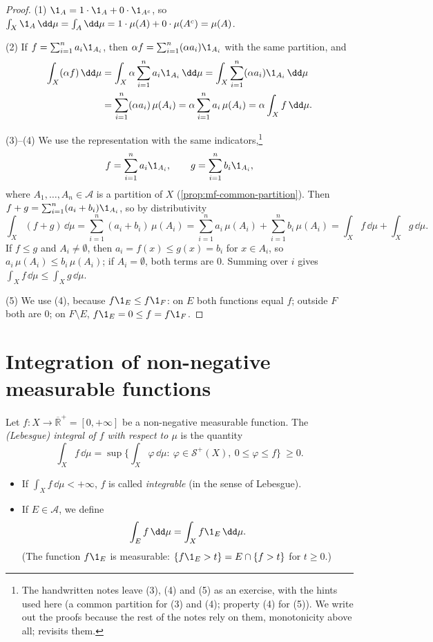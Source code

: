 \begin{proof}
(1) $\1_A=1\cdot\1_A+0\cdot\1_{A^c}$, so
$\int_X\1_A\,\dd\mu=\int_A\dd\mu=1\cdot\mu(A)+0\cdot\mu(A^c)=\mu(A)$.

(2) If $f=\sum_{i=1}^na_i\1_{A_i}$, then $\alpha f=\sum_{i=1}^n(\alpha a_i)\1_{A_i}$ with the same
partition, and
\begin{align*}
  \int_X(\alpha f)\,\dd\mu&=\int_X\alpha\sum_{i=1}^na_i\1_{A_i}\,\dd\mu
  =\int_X\sum_{i=1}^n(\alpha a_i)\1_{A_i}\,\dd\mu\\
  &=\sum_{i=1}^n(\alpha a_i)\,\mu(A_i)=\alpha\sum_{i=1}^na_i\,\mu(A_i)=\alpha\int_Xf\,\dd\mu .
\end{align*}

(3)--(4) We use the representation with the same indicators,\footnote{The handwritten notes
leave (3), (4) and (5) as an exercise, with the hints used here (a common partition for (3) and
(4); property (4) for (5)). We write out the proofs because the rest of the notes rely on them,
monotonicity above all;  revisits them.}
\[
  f=\sum_{i=1}^na_i\1_{A_i},\qquad g=\sum_{i=1}^nb_i\1_{A_i},
\]
where $A_1,\dots,A_n\in\mathcal A$ is a partition of $X$ (\cref{prop:mf-common-partition}). Then
$f+g=\sum_{i=1}^n(a_i+b_i)\1_{A_i}$, so by distributivity
\[
  \int_X(f+g)\,\dd\mu=\sum_{i=1}^n(a_i+b_i)\,\mu(A_i)=\sum_{i=1}^na_i\,\mu(A_i)+\sum_{i=1}^nb_i\,\mu(A_i)
  =\int_Xf\,\dd\mu+\int_Xg\,\dd\mu .
\]
If $f\le g$ and $A_i\ne\emptyset$, then $a_i=f(x)\le g(x)=b_i$ for $x\in A_i$, so
$a_i\,\mu(A_i)\le b_i\,\mu(A_i)$; if $A_i=\emptyset$, both terms are $0$. Summing over $i$ gives
$\int_Xf\,\dd\mu\le\int_Xg\,\dd\mu$.

(5) We use (4), because $f\1_E\le f\1_F$: on $E$ both functions equal $f$; outside $F$ both
are $0$; on $F\setminus E$, $f\1_E=0\le f=f\1_F$.
\end{proof}

\section{Integration of non-negative measurable functions}\label{sec:in-measurable}

\begin{definition}\label{def:in-integral}
Let $f:X\to\overline{\mathbb R}^+=[0,+\infty]$ be a non-negative measurable function. The
\emph{(Lebesgue) integral of $f$ with respect to $\mu$} is the quantity
\[
  \int_Xf\,\dd\mu=\sup\Big\{\int_X\varphi\,\dd\mu:\ \varphi\in\mathcal S^+(X),\ 0\le\varphi\le f\Big\}\ \ge0 .
\]
\begin{itemize}
  \item If $\int_Xf\,\dd\mu<+\infty$, $f$ is called \emph{integrable} (in the sense of Lebesgue).
  \item If $E\in\mathcal A$, we define
    \[
      \int_Ef\,\dd\mu=\int_Xf\1_E\,\dd\mu .
    \]
    (The function $f\1_E$ is measurable: $\{f\1_E>t\}=E\cap\{f>t\}$ for $t\ge0$.)
\end{itemize}
\end{definition}

